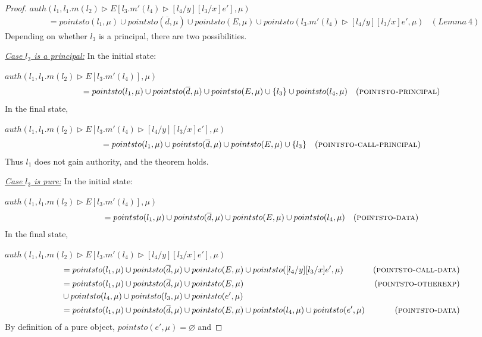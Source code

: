 \documentclass{llncs}
\begin{document}
\begin{proof}
\noindent$auth(l_1, l_1.m(l_2) \rhd E[l_3.m'(l_4) \rhd [l_4/y] [l_3/x] e'], \mu)$
\vspace{-7pt}
\begin{align*}
&= pointsto(l_1, \mu) \cup pointsto(\overline{d}, \mu) \cup pointsto(E, \mu) \cup pointsto(l_3.m'(l_4) \rhd [l_4/y] [l_3/x] e', \mu) & (Lemma~4)
\end{align*}
Depending on whether $l_3$ is a principal, there are two possibilities.

\noindent\underline{\textit{Case $l_3$ is a principal:}} In the initial state:

\noindent$auth(l_1, l_1.m(l_2) \rhd E[l_3.m'(l_4)], \mu)$
\vspace{-7pt}
\begin{align*}
&= pointsto(l_1, \mu) \cup pointsto(\overline{d}, \mu) \cup pointsto(E, \mu) \cup \{ l_3 \} \cup pointsto(l_4, \mu) & (\textsc{pointsto-principal})
\end{align*}
In the final state,

\noindent$auth(l_1, l_1.m(l_2) \rhd E[l_3.m'(l_4) \rhd [l_4/y] [l_3/x] e'], \mu)$
\vspace{-7pt}
\begin{align*}
&= pointsto(l_1, \mu) \cup pointsto(\overline{d}, \mu) \cup pointsto(E, \mu) \cup \{ l_3 \} & (\textsc{pointsto-call-principal})
\end{align*}
Thus $l_1$ does not gain authority, and the theorem holds.

\noindent\underline{\textit{Case $l_3$ is pure:}} In the initial state:

\noindent$auth(l_1, l_1.m(l_2) \rhd E[l_3.m'(l_4)], \mu)$
\vspace{-7pt}
\begin{align*}
&= pointsto(l_1, \mu) \cup pointsto(\overline{d}, \mu) \cup pointsto(E, \mu) \cup pointsto(l_4, \mu) & (\textsc{pointsto-data})
\end{align*}
In the final state,

\noindent$auth(l_1, l_1.m(l_2) \rhd E[l_3.m'(l_4) \rhd [l_4/y] [l_3/x] e'], \mu)$
\vspace{-7pt}
\begin{align*}
&= pointsto(l_1, \mu) \cup pointsto(\overline{d}, \mu) \cup pointsto(E, \mu) \cup pointsto([l_4/y] [l_3/x] e', \mu) & (\textsc{pointsto-call-data})\\
&= pointsto(l_1, \mu) \cup pointsto(\overline{d}, \mu) \cup pointsto(E, \mu) & (\textsc{pointsto-otherexp})\\
&\cup pointsto(l_4, \mu) \cup pointsto(l_3, \mu) \cup pointsto(e', \mu)\\
&= pointsto(l_1, \mu) \cup pointsto(\overline{d}, \mu) \cup pointsto(E, \mu) \cup pointsto(l_4, \mu) \cup pointsto(e', \mu) & (\textsc{pointsto-data})
\end{align*}
By definition of a pure object, $pointsto(e', \mu) = \varnothing$ and


\end{proof}
\end{document}
